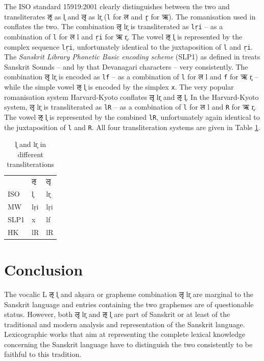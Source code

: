 The ISO standard 15919:2001 clearly distinguishes between the two and  transliterates {\devfont ऌ} as l̥ and {\devfont लृ} as lr̥ (\texttt{l} for {\devfont ल} and \texttt{r̥} for {\devfont ऋ}). The romanisation used in \citet{mw72,mw} conflates the two. The combination {\devfont लृ} lr̥ is transliterated as \texttt{lṛi} – as a combination of \texttt{l} for {\devfont ल} l and \texttt{ṛi} for {\devfont ऋ} r̥. The vowel {\devfont ऌ} l̥ is represented by the complex sequence \texttt{lṛi}, unfortunately  identical to the juxtaposition of \texttt{l} and \texttt{ṛi}. The \emph{Sanskrit Library Phonetic Basic encoding scheme} (SLP1) as defined in \citet{ScharfHyman2011} treats Sanskrit Sounds – and by that Devanagari characters – very consistently. The combination {\devfont लृ} lr̥ is encoded as \texttt{lf} – as a combination of \texttt{l} for {\devfont ल} l and \texttt{f} for {\devfont ऋ} r̥ – while the simple vowel {\devfont ऌ} l̥ is encoded by the simplex \texttt{x}. The very popular romanisation system Harvard-Kyoto conflates {\devfont लृ} lr̥ and {\devfont ऌ} l̥. In the Harvard-Kyoto system, {\devfont लृ} lr̥  is transliterated as  \texttt{lR} – as a combination of \texttt{l} for {\devfont ल} l and \texttt{R} for {\devfont ऋ} r̥. The vowel {\devfont ऌ} l̥  is represented by the combined \texttt{lR}, unfortunately again identical to the juxtaposition of \texttt{l} and \texttt{R}. All four transliteration systems are given in Table \ref{tab:latin}. 

\begin{table}[!h]
\begin{center}
\begin{tabular}{lll}
&{\devfont ऌ}&{\devfont लृ}\\
ISO & l̥ & lr̥\\
MW & lṛi & lṛi\\
SLP1 & x & lf\\
HK & lR & lR\\
\end{tabular}
\end{center}
\caption[l̥ and lr̥ in different transliterations]{\label{tab:latin}l̥ and lr̥ in different transliterations}
\end{table}

\section{Conclusion}

The vocalic L {\devfont ऌ} l̥ and akṣara or grapheme combination {\devfont लृ} lr̥ are marginal to the Sanskrit language and entries containing the two graphemes are of questionable status. However, both  {\devfont लृ} lr̥ and {\devfont ऌ} l̥ are part of Sanskrit or at least of the traditional and modern analysis and representation of the Sanskrit language. Lexicographic works that aim at representing the complete lexical knowledge concerning the Sanskrit language have to distinguish the two consistently to be faithful to this tradition.

